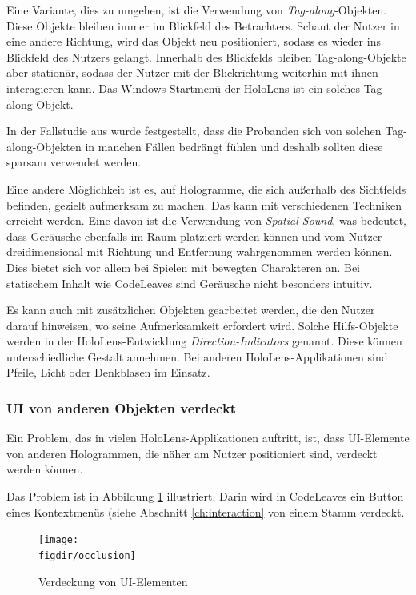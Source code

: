 Eine Variante, dies zu umgehen, ist die Verwendung von \textit{Tag-along}-Objekten. Diese Objekte bleiben immer im Blickfeld des Betrachters. Schaut der Nutzer in eine andere Richtung, wird das Objekt neu positioniert, sodass es wieder ins Blickfeld des Nutzers gelangt. Innerhalb des Blickfelds bleiben Tag-along-Objekte aber stationär, sodass der Nutzer mit der Blickrichtung weiterhin mit ihnen interagieren kann. Das Windows-Startmenü der HoloLens ist ein solches Tag-along-Objekt.

In der Fallstudie aus \cite{windows2017casestudy3} wurde festgestellt, dass die Probanden sich von solchen Tag-along-Objekten in manchen Fällen bedrängt fühlen und  deshalb sollten diese sparsam verwendet werden.

Eine andere Möglichkeit ist es, auf Hologramme, die sich außerhalb des Sichtfelds befinden, gezielt aufmerksam zu machen. Das kann mit verschiedenen Techniken erreicht werden. Eine davon ist die Verwendung von \textit{Spatial-Sound}, was bedeutet, dass Geräusche ebenfalls im Raum platziert werden können und vom Nutzer dreidimensional mit Richtung und Entfernung wahrgenommen werden können. Dies bietet sich vor allem bei Spielen mit bewegten Charakteren an. Bei statischem Inhalt wie CodeLeaves sind Geräusche nicht besonders intuitiv.

Es kann auch mit zusätzlichen Objekten gearbeitet werden, die den Nutzer darauf hinweisen, wo seine Aufmerksamkeit erfordert wird. Solche Hilfs-Objekte werden in der HoloLens-Entwicklung \textit{Direction-Indicators} genannt. Diese können unterschiedliche Gestalt annehmen. Bei anderen HoloLens-Applikationen sind Pfeile, Licht oder Denkblasen im Einsatz.

\subsubsection*{UI von anderen Objekten verdeckt}

Ein Problem, das in vielen HoloLens-Applikationen auftritt, ist, dass UI-Elemente von anderen Hologrammen, die näher am Nutzer positioniert sind, verdeckt werden können.

Das Problem ist in Abbildung \ref{fig:occlusion} illustriert. Darin wird in CodeLeaves ein Button eines Kontextmenüs (siehe Abschnitt \ref{ch:interaction} von einem Stamm verdeckt.

\begin{figure}[htb]
  \texttt{[image: \\figdir/occlusion]}
  \caption{Verdeckung von UI-Elementen}
  \label{fig:occlusion}
\end{figure}

